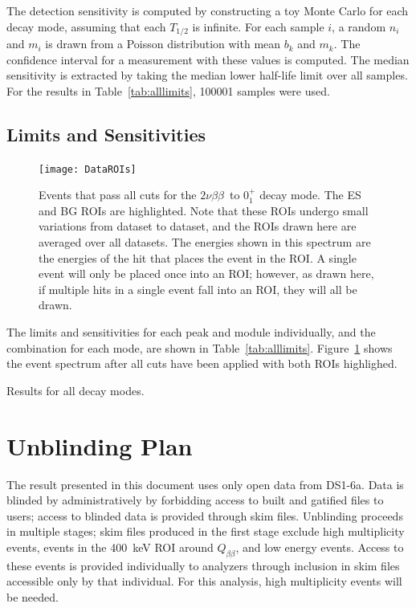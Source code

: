 \documentclass[notitlepage,rmp,aps,10pt]{revtex4-1}
\newcommand{\tnbb}{${2 \nu \beta \beta}$}
\newcommand{\Qbb}{$Q_{\beta\beta}$}
\newcommand{\SP}[3]{$#1^{#2}_{#3}$}
\begin{document}
The detection sensitivity is computed by constructing a toy Monte Carlo for each decay mode, assuming that each $T_{1/2}$ is infinite.
For each sample $i$, a random $n_i$ and $m_i$ is drawn from a Poisson distribution with mean $b_k$ and $m_k$.
The confidence interval for a measurement with these values is computed.
The median sensitivity is extracted by taking the median lower half-life limit over all samples.
For the results in Table~\ref{tab:alllimits}, 100001 samples were used.

\subsection{Limits and Sensitivities}
\begin{figure}[h]
  \centering
  \texttt{[image: DataROIs]}
  \caption[Measured events after all cuts with ROIs drawn]{\label{fig:roievents}
    Events that pass all cuts for the \tnbb\ to \SP{0}{+}{1} decay mode. The ES and BG ROIs are highlighted. Note that these ROIs undergo small variations from dataset to dataset, and the ROIs drawn here are averaged over all datasets. The energies shown in this spectrum are the energies of the hit that places the event in the ROI. A single event will only be placed once into an ROI; however, as drawn here, if multiple hits in a single event fall into an ROI, they will all be drawn.
  }
\end{figure}
The limits and sensitivities for each peak and module individually, and the combination for each mode, are shown in Table~\ref{tab:alllimits}.
Figure~\ref{fig:roievents} shows the event spectrum after all cuts have been applied with both ROIs highlighed.

\begin{table}[h]
  \scriptsize
  \centering
  
  \caption[Final results for all decay modes]{ \label{tab:alllimits}
    Results for all decay modes.
  }
\end{table}

\section{Unblinding Plan}
The result presented in this document uses only open data from DS1-6a.
Data is blinded by administratively by forbidding access to built and gatified files to users; access to blinded data is provided through skim files.
Unblinding proceeds in multiple stages; skim files produced in the first stage exclude high multiplicity events, events in the 400~keV ROI around \Qbb, and low energy events.
Access to these events is provided individually to analyzers through inclusion in skim files accessible only by that individual.
For this analysis, high multiplicity events will be needed.
\end{document}

